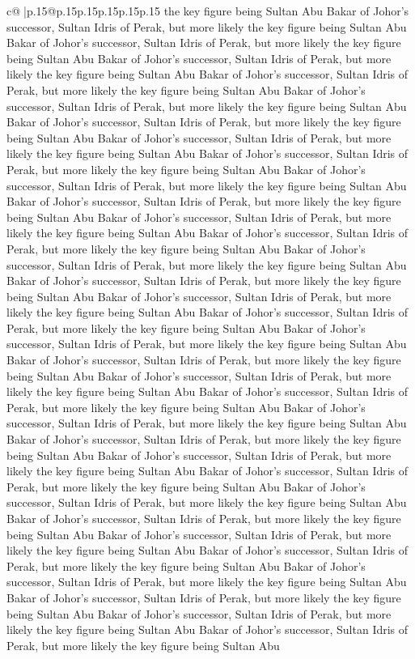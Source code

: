 \documentclass{article}
\begin{document}
{\begin{supertabular}{c@{$\;$}|p{.15\linewidth}@{}p{.15\linewidth}p{.15\linewidth}p{.15\linewidth}p{.15\linewidth}p{.15\linewidth}}
{{{the key figure being Sultan Abu Bakar of Johor's successor, Sultan Idris of Perak, but more likely the key figure being Sultan Abu Bakar of Johor's successor, Sultan Idris of Perak, but more likely the key figure being Sultan Abu Bakar of Johor's successor, Sultan Idris of Perak, but more likely the key figure being Sultan Abu Bakar of Johor's successor, Sultan Idris of Perak, but more likely the key figure being Sultan Abu Bakar of Johor's successor, Sultan Idris of Perak, but more likely the key figure being Sultan Abu Bakar of Johor's successor, Sultan Idris of Perak, but more likely the key figure being Sultan Abu Bakar of Johor's successor, Sultan Idris of Perak, but more likely the key figure being Sultan Abu Bakar of Johor's successor, Sultan Idris of Perak, but more likely the key figure being Sultan Abu Bakar of Johor's successor, Sultan Idris of Perak, but more likely the key figure being Sultan Abu Bakar of Johor's successor, Sultan Idris of Perak, but more likely the key figure being Sultan Abu Bakar of Johor's successor, Sultan Idris of Perak, but more likely the key figure being Sultan Abu Bakar of Johor's successor, Sultan Idris of Perak, but more likely the key figure being Sultan Abu Bakar of Johor's successor, Sultan Idris of Perak, but more likely the key figure being Sultan Abu Bakar of Johor's successor, Sultan Idris of Perak, but more likely the key figure being Sultan Abu Bakar of Johor's successor, Sultan Idris of Perak, but more likely the key figure being Sultan Abu Bakar of Johor's successor, Sultan Idris of Perak, but more likely the key figure being Sultan Abu Bakar of Johor's successor, Sultan Idris of Perak, but more likely the key figure being Sultan Abu Bakar of Johor's successor, Sultan Idris of Perak, but more likely the key figure being Sultan Abu Bakar of Johor's successor, Sultan Idris of Perak, but more likely the key figure being Sultan Abu Bakar of Johor's successor, Sultan Idris of Perak, but more likely the key figure being Sultan Abu Bakar of Johor's successor, Sultan Idris of Perak, but more likely the key figure being Sultan Abu Bakar of Johor's successor, Sultan Idris of Perak, but more likely the key figure being Sultan Abu Bakar of Johor's successor, Sultan Idris of Perak, but more likely the key figure being Sultan Abu Bakar of Johor's successor, Sultan Idris of Perak, but more likely the key figure being Sultan Abu Bakar of Johor's successor, Sultan Idris of Perak, but more likely the key figure being Sultan Abu Bakar of Johor's successor, Sultan Idris of Perak, but more likely the key figure being Sultan Abu Bakar of Johor's successor, Sultan Idris of Perak, but more likely the key figure being Sultan Abu Bakar of Johor's successor, Sultan Idris of Perak, but more likely the key figure being Sultan Abu Bakar of Johor's successor, Sultan Idris of Perak, but more likely the key figure being Sultan Abu Bakar of Johor's successor, Sultan Idris of Perak, but more likely the key figure being Sultan Abu Bakar of Johor's successor, Sultan Idris of Perak, but more likely the key figure being Sultan Abu Bakar of Johor's successor, Sultan Idris of Perak, but more likely the key figure being Sultan Abu }}}
\end{supertabular}}
\end{document}
